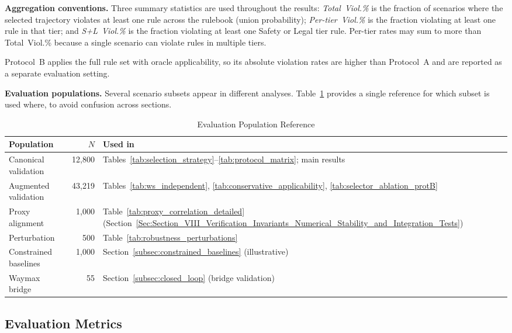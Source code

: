 \noindent\textbf{Aggregation conventions.}  Three summary statistics are used throughout the results: \emph{Total~Viol.\%} is the fraction of scenarios where the selected trajectory violates at least one rule across the rulebook (union probability); \emph{Per-tier~Viol.\%} is the fraction violating at least one rule in that tier; and \emph{S+L~Viol.\%} is the fraction violating at least one Safety or Legal tier rule. Per-tier rates may sum to more than Total~Viol.\% because a single scenario can violate rules in multiple tiers.

\noindent Protocol~B applies the full rule set with oracle applicability, so its absolute violation rates are higher than Protocol~A and are reported as a separate evaluation setting.

\noindent\textbf{Evaluation populations.}  Several scenario subsets appear in different analyses.  Table~\ref{tab:eval_populations} provides a single reference for which subset is used where, to avoid confusion across sections.

\begin{table}[t]
\centering
\caption{Evaluation Population Reference}
\label{tab:eval_populations}
\setlength{\tabcolsep}{3pt}
\begin{tabular}{lrl}
\toprule
\textbf{Population} & \textbf{$N$} & \textbf{Used in} \\
\midrule
Canonical validation & 12{,}800 & Tables~\ref{tab:selection_strategy}--\ref{tab:protocol_matrix}; main results \\
Augmented validation & 43{,}219 & Tables~\ref{tab:ws_independent}, \ref{tab:conservative_applicability}, \ref{tab:selector_ablation_protB} \\
Proxy alignment & 1{,}000 & Table~\ref{tab:proxy_correlation_detailed} (Section~\ref{Sec:Section_VIII_Verification_Invariants_Numerical_Stability_and_Integration_Tests}) \\
Perturbation & 500 & Table~\ref{tab:robustness_perturbations} \\
Constrained baselines & 1{,}000 & Section~\ref{subsec:constrained_baselines} (illustrative) \\
Waymax bridge & 55 & Section~\ref{subsec:closed_loop} (bridge validation) \\
\bottomrule
\end{tabular}
\end{table}

\subsection{Evaluation Metrics}
\label{subsec:metrics}

